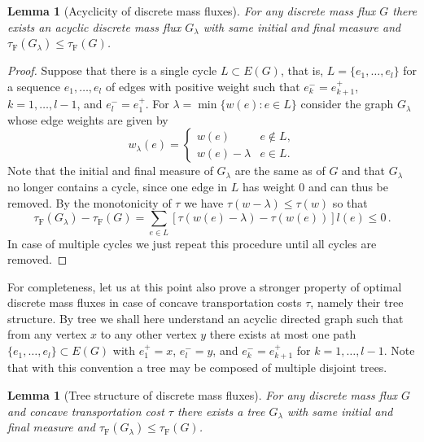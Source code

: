 \documentclass[10pt,a4paper,oneside,final]{article}
\newcommand{\JEnXia}[1][\tau]{#1_{\mathrm{F}}}%
\newcommand{\transportPath}{mass flux}
\newcommand{\transportPaths}{mass fluxes}
\numberwithin{equation}{section}
\theoremstyle{plain}
\newtheorem{lemma}[theorem]{Lemma}
\theoremstyle{definition}
\theoremstyle{remark}
\newcommand{\notinclude}[1]{}
\begin{document}
\begin{lemma}[Acyclicity of discrete \transportPaths{}]\label{thm:no_cycles_lemma}
For any discrete \transportPath{} $G$ there exists an acyclic discrete \transportPath{} $G_\lambda$ with same initial and final measure and $\JEnXia(G_\lambda)\leq\JEnXia(G)$.
\end{lemma}
\begin{proof}
Suppose that there is a single cycle $L\subset E(G)$, that is, $L=\{e_1,\ldots,e_l\}$ for a sequence $e_1,\ldots,e_l$ of edges with positive weight such that $e_k^-=e_{k+1}^+$, $k=1,\ldots,l-1$, and $e_l^-=e_1^+$\notinclude{ loop of edges with consistent direction and positive weight}.
For $\lambda=\min\{w(e) : e \in L\}$ consider the graph $G_\lambda$ whose edge weights are given by
\begin{displaymath}
 w_\lambda(e) = \begin{cases}
                 w(e) & e \notin L,\\
                 w(e)-\lambda & e \in L.
                \end{cases}
\end{displaymath}
Note that the initial and final measure of $G_\lambda$ are the same as of $G$ and that $G_\lambda$ no longer contains a cycle, since one edge in $L$ has weight $0$ and can thus be removed.
By the monotonicity of $\tau$ we have $\tau(w-\lambda)\leq\tau(w)$ so that
\begin{equation*}
 \JEnXia(G_\lambda)-\JEnXia(G)
 = \sum_{e \in L} [\tau(w(e)-\lambda)-\tau(w(e))]l(e)
 \leq0\,.
\end{equation*}
In case of multiple cycles we just repeat this procedure until all cycles are removed.
\end{proof}

For completeness, let us at this point also prove a stronger property of optimal discrete \transportPaths{} in case of concave transportation costs $\tau$, namely their tree structure.
By tree we shall here understand an acyclic directed graph such that from any vertex $x$ to any other vertex $y$ there exists at most one path $\{e_1,\ldots,e_l\}\subset E(G)$ with $e_1^+=x$, $e_l^-=y$, and $e_k^-=e_{k+1}^+$ for $k=1,\ldots,l-1$\notinclude{consistent with the edge orientations}.
Note that with this convention a tree may be composed of multiple disjoint trees.
\notinclude{Note that the trees do not have to be trunk trees!}

\begin{lemma}[Tree structure of discrete \transportPaths{}]\label{thm:treeStructure}
For any discrete \transportPath{} $G$ and concave transportation cost $\tau$ there exists a tree $G_\lambda$ with same initial and final measure and $\JEnXia(G_\lambda)\leq\JEnXia(G)$.
\end{lemma}
\end{document}
